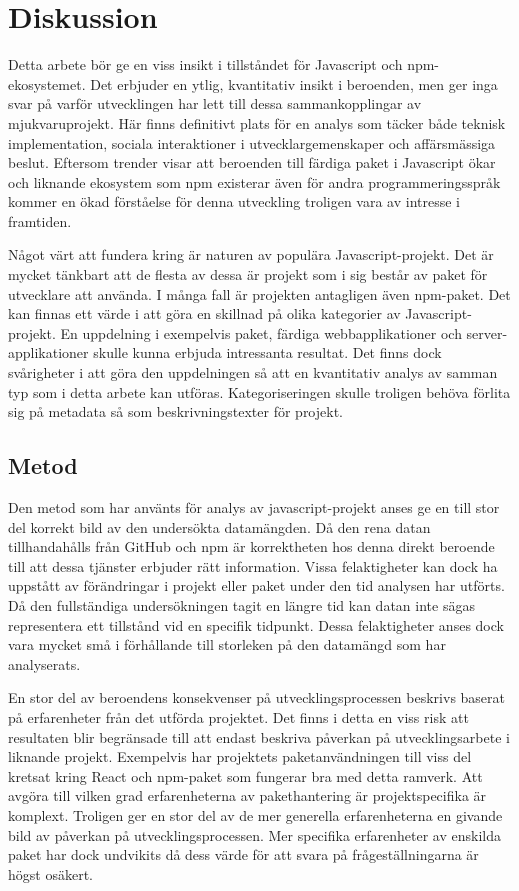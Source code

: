 \section{Diskussion}
\label{sec:joel_o-discussion}
Detta arbete bör ge en viss insikt i tillståndet för Javascript och npm-ekosystemet. Det erbjuder en ytlig, kvantitativ insikt i beroenden, men ger inga svar på varför utvecklingen har lett till dessa sammankopplingar av mjukvaruprojekt. Här finns definitivt plats för en analys som täcker både teknisk implementation, sociala interaktioner i utvecklargemenskaper och affärsmässiga beslut. Eftersom trender visar att beroenden till färdiga paket i Javascript ökar\cite{Wittern:2016} och liknande ekosystem som npm existerar även för andra programmeringsspråk kommer en ökad förståelse för denna utveckling troligen vara av intresse i framtiden.

Något värt att fundera kring är naturen av populära Javascript-projekt. Det är mycket tänkbart att de flesta av dessa är projekt som i sig består av paket för utvecklare att använda. I många fall är projekten antagligen även npm-paket. Det kan finnas ett värde i att göra en skillnad på olika kategorier av Javascript-projekt. En uppdelning i exempelvis paket, färdiga webbapplikationer och server-applikationer skulle kunna erbjuda intressanta resultat. Det finns dock svårigheter i att göra den uppdelningen så att en kvantitativ analys av samman typ som i detta arbete kan utföras. Kategoriseringen skulle troligen behöva förlita sig på metadata så som beskrivningstexter för projekt.

\subsection{Metod}
\label{subsec:joel_o-discussion-method}
Den metod som har använts för analys av javascript-projekt anses ge en till stor del korrekt bild av den undersökta datamängden. Då den rena datan tillhandahålls från GitHub och npm är korrektheten hos denna direkt beroende till att dessa tjänster erbjuder rätt information. Vissa felaktigheter kan dock ha uppstått av förändringar i projekt eller paket under den tid analysen har utförts. Då den fullständiga undersökningen tagit en längre tid kan datan inte sägas representera ett tillstånd vid en specifik tidpunkt. Dessa felaktigheter anses dock vara mycket små i förhållande till storleken på den datamängd som har analyserats.

En stor del av beroendens konsekvenser på utvecklingsprocessen beskrivs baserat på erfarenheter från det utförda projektet. Det finns i detta en viss risk att resultaten blir begränsade till att endast beskriva påverkan på utvecklingsarbete i liknande projekt. Exempelvis har projektets paketanvändningen till viss del kretsat kring React och npm-paket som fungerar bra med detta ramverk. Att avgöra till vilken grad erfarenheterna av pakethantering är projektspecifika är komplext. Troligen ger en stor del av de mer generella erfarenheterna en givande bild av påverkan på utvecklingsprocessen. Mer specifika erfarenheter av enskilda paket har dock undvikits då dess värde för att svara på frågeställningarna är högst osäkert.

